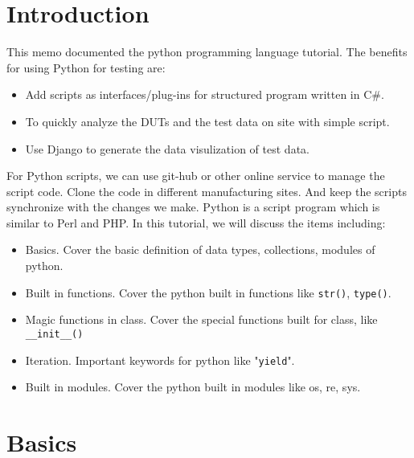 \section{Introduction}
This memo documented the python programming language tutorial. The benefits for using Python for
testing are: 
\begin{itemize}
\item
Add scripts as interfaces/plug-ins for structured program written in C\#.
\item
To quickly analyze the DUTs and the test data on site with simple script.
\item
Use Django to generate the data visulization of test data.
\end{itemize}
For Python scripts, we can use git-hub or other online service to manage the
script code.  Clone the code in different manufacturing sites.
And keep the scripts synchronize with the changes we make.
Python is a script program which is similar to Perl and PHP. In this tutorial,
we will discuss the
items including: 
\begin{itemize}
\item
Basics. Cover the basic definition of data types, collections, modules of python.
\item
Built in functions. Cover the python built in functions like \verb/str()/, \verb/type()/.
\item
Magic functions in class. Cover the special functions built for class, like \verb/__init__()/
\item
Iteration. Important keywords for python like "\verb/yield/".
\item
Built in modules. Cover the python built in modules like os, re, sys.
\end{itemize}

\section{Basics}

